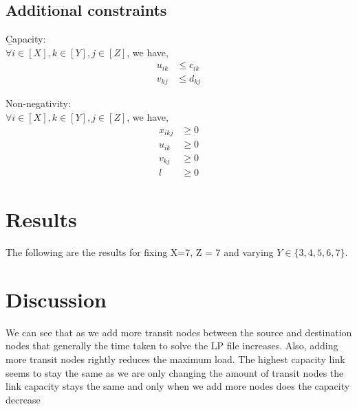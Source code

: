 \documentclass[12pt,twoside]{article}
\begin{document}
\subsection{Additional constraints}\label{Sec: Const} 
\b{Capacity}:\\
$\forall i \in [X], k \in [Y], j \in [Z]$, we have,
\begin{align}
	u_{ik} &\leq c_{ik} \\
	v_{kj} &\leq d_{kj}  
\end{align}


Non-negativity:\\
$\forall i \in [X], k \in [Y], j \in [Z]$, we have,
\begin{align}
	x_{ikj} &\geq 0\\
	u_{ik} &\geq 0\\
	v_{kj} &\geq 0\\
	l &\geq 0 \label{last}
\end{align}

\section{Results}
The following are the results for fixing X=7, Z = 7 and varying $Y \in {\{3,4,5,6,7\}}$.\\
\begin{center}
\end{center}

\section{Discussion}
We can see that as we add more transit nodes between the source and destination nodes that generally the time taken to solve the LP file increases. Also, adding more transit nodes rightly reduces the maximum load. The highest capacity link seems to stay the same as we are only changing the amount of transit nodes the link capacity stays the same and only when we add more nodes does the capacity decrease 











\end{document}
